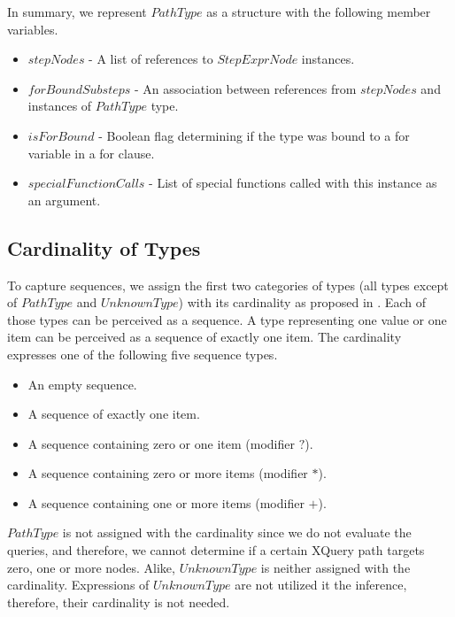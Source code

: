 In summary, we represent $PathType$ as a structure with the following member variables. 
\begin{itemize}
\item $stepNodes$ - A list of references to $StepExprNode$ instances.
\item $forBoundSubsteps$ - An association between references from $stepNodes$ and instances of $PathType$ type.
\item $isForBound$ - Boolean flag determining if the type was bound to a for variable in a for clause.
\item $specialFunctionCalls$ - List of special functions called with this instance as an argument.
\end{itemize}

\subsection{Cardinality of Types}

To capture sequences, we assign the first two categories of types (all types except of $PathType$ and $UnknownType$) with its cardinality as proposed in . Each of those types can be perceived as a sequence. A type representing one value or one item can be perceived as a sequence of exactly one item. The cardinality expresses one of the following five sequence types.

\begin{itemize}
\item An empty sequence.
\item A sequence of exactly one item.
\item A sequence containing zero or one item (modifier $?$).
\item A sequence containing zero or more items (modifier $*$).
\item A sequence containing one or more items (modifier $+$).
\end{itemize}

$PathType$ is not assigned with the cardinality since we do not evaluate the queries, and therefore, we cannot determine if a certain XQuery path targets zero, one or more nodes. Alike, $UnknownType$ is neither assigned with the cardinality. Expressions of $UnknownType$ are not utilized it the inference, therefore, their cardinality is not needed.


